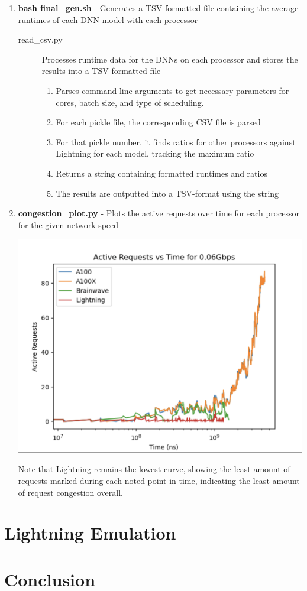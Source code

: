 \documentclass[11pt]{article}
\begin{document}
\begin{enumerate}
    \item \textbf{bash final\_gen.sh} - Generates a TSV-formatted file containing the average runtimes of each DNN model with each processor
    \begin{description}
        \item[read\_csv.py] Processes runtime data for the DNNs on each processor and stores the results into a TSV-formatted file
        \begin{enumerate}
            \item Parses command line arguments to get necessary parameters for cores, batch size, and type of scheduling.
            \item For each pickle file, the corresponding CSV file is parsed
            \item For that pickle number, it finds ratios for other processors against Lightning for each model, tracking the maximum ratio
            \item Returns a string containing formatted runtimes and ratios
            \item The results are outputted into a TSV-format using the string 
        \end{enumerate}
    \end{description}

    \item \textbf{congestion\_plot.py} - Plots the active requests over time for each processor for the given network speed
    
    \includegraphics[scale=.75]{congestion.png}

    Note that Lightning remains the lowest curve, showing the least amount of requests marked during each noted point in time, indicating the least amount of request congestion overall.

\end{enumerate}

\section{Lightning Emulation}



\section{Conclusion}
\end{document}
